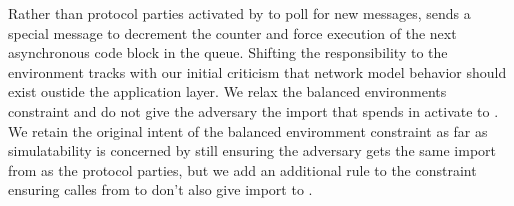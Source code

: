Rather than protocol parties activated by \Z to poll for new messages, \Z sends
a special  message to decrement the counter and force
execution of the next asynchronous code block in the queue.  Shifting the
responsibility to the environment tracks with our initial criticism that
network model behavior should exist oustide the application layer.  We relax
the balanced environments constraint and do not give the adversary the import
that \Z spends in activate \fwrapper to .  We retain the
original intent of the balanced enviromment constraint as far as simulatability
is concerned by still ensuring the adversary gets the same import from \Z as
the protocol parties, but we add an additional rule to the constraint ensuring
 calles from \Z to \F don't also give import to \A.

%
%
%
%
%
%
%

